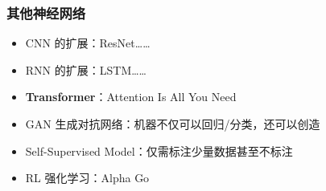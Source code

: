\begin{frame}
    \frametitle{其他神经网络}
    \begin{itemize}
        \item CNN 的扩展：ResNet……
        \item RNN 的扩展：LSTM……
        \item \textbf{Transformer}：Attention Is All You Need\parencite{vaswani2017attention}
        \item GAN 生成对抗网络：机器不仅可以回归/分类，还可以创造
        \item Self-Supervised Model：仅需标注少量数据甚至不标注
        \item RL 强化学习：Alpha Go
    \end{itemize}
\end{frame}
